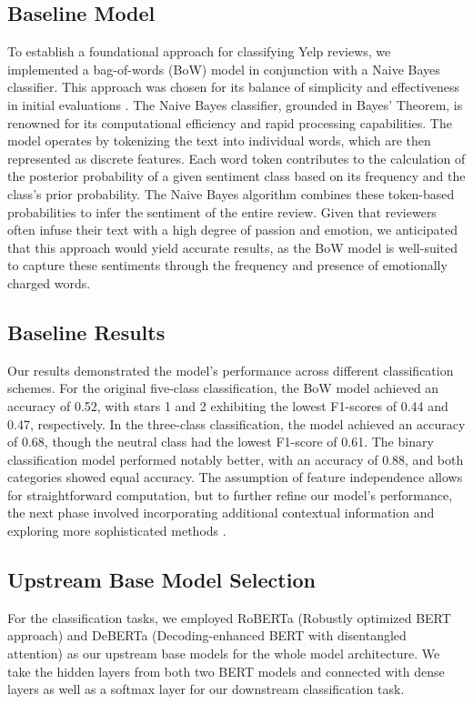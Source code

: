 \documentclass[12pt]{article}
\begin{document}
\subsection{Baseline Model}
To establish a foundational approach for classifying Yelp reviews, we implemented a bag-of-words (BoW) model in conjunction with a Naive Bayes classifier. This approach was chosen for its balance of simplicity and effectiveness in initial evaluations \citep{rish2001empirical}. The Naive Bayes classifier, grounded in Bayes' Theorem, is renowned for its computational efficiency and rapid processing capabilities. The model operates by tokenizing the text into individual words, which are then represented as discrete features. Each word token contributes to the calculation of the posterior probability of a given sentiment class based on its frequency and the class's prior probability. The Naive Bayes algorithm combines these token-based probabilities to infer the sentiment of the entire review. Given that reviewers often infuse their text with a high degree of passion and emotion, we anticipated that this approach would yield accurate results, as the BoW model is well-suited to capture these sentiments through the frequency and presence of emotionally charged words.

\subsection{Baseline Results}
Our results demonstrated the model’s performance across different classification schemes. For the original five-class classification, the BoW model achieved an accuracy of 0.52, with stars 1 and 2 exhibiting the lowest F1-scores of 0.44 and 0.47, respectively. In the three-class classification, the model achieved an accuracy of 0.68, though the neutral class had the lowest F1-score of 0.61. The binary classification model performed notably better, with an accuracy of 0.88, and both categories showed equal accuracy. The assumption of feature independence allows for straightforward computation, but to further refine our model's performance, the next phase involved incorporating additional contextual information and exploring more sophisticated methods \citep{rish2001empirical}.

\subsection{Upstream Base Model Selection}
For the classification tasks, we employed RoBERTa (Robustly optimized BERT approach) and DeBERTa (Decoding-enhanced BERT with disentangled attention) as our upstream base models for the whole model architecture. We take the hidden layers from both two BERT models and connected with dense layers as well as a softmax layer for our downstream classification task. 
\end{document}
